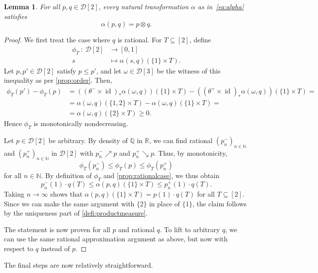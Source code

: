 \documentclass[11pt,a4paper]{scrartcl}
\newcommand{\N}{\mathbb{N}}
\newcommand{\Q}{\mathbb{Q}}
\newcommand{\R}{\mathbb{R}}
\newcommand{\id}{\operatorname{id}}
\newcommand{\finiteset}[1]{[#1]}	%
\newcommand{\two}{\finiteset{2}}		%
\newcommand{\three}{\finiteset{3}}		%
\newcommand{\dist}{\mathcal{D}}
\newtheorem{lem}[theo]{Lemma}
\theoremstyle{definition}
\begin{document}
\begin{lem}\label{lem:bernoulliirrational}
	For all $p, q \in \dist\two$, every natural transformation $\alpha$ as in~\eqref{eq:alpha} satisfies
  \[
	  \alpha(p,q) = p \otimes q.
  \]
\end{lem}
\begin{proof}
	We first treat the case where $q$ is rational.
  For $T \subseteq \two$, define
  \begin{align*}
		\phi_T \: : \: \dist\two & \longrightarrow [0,1] \\
		s & \longmapsto \alpha(s,q)(\{1\} \times T).
  \end{align*}
	Let $p,p' \in \dist \two$ satisfy $p \leq p'$, and let $\omega \in \dist\three$ be the witness of this inequality as per \cref{prop:order}.
	Then,
  \begin{align*}
    \phi_T(p') - \phi_T(p) &= ((\theta^- \times \id)_\ast\alpha(\omega,q))(\{1\} \times T) - ((\theta^+ \times \id)_\ast\alpha(\omega,q))(\{1\} \times T) = \\
                          &= \alpha(\omega,q)(\{1,2\} \times T) - \alpha(\omega,q)(\{1\} \times T) = \\
                          &= \alpha(\omega,q)(\{2\} \times T) \geq 0.
  \end{align*}
  Hence $\phi_T$ is monotonically nondecreasing.

	Let $p \in \dist\two$ be arbitrary. By density of $\Q$ in $\R$, we can find rational $(p_n^-)_{n \in \N}$ and $(p_n^+)_{n \in \N}$ in $\dist\two$ 
	with $p_n^- \nearrow p$ and $p^+_n \searrow p$. Thus, by monotonicity,
    \[
      \phi_T(p^-_n) \leq \phi_T(p) \leq \phi_T(p^+_n)
    \]
  for all $n \in \N$. By definition of $\phi_T$ and \cref{prop:rationalcase}, we thus obtain
  \[
    p^-_n(1) \cdot q(T) \leq \alpha(p,q)(\{1\} \times T) \leq p^+_n(1) \cdot q(T).
  \]
  Taking $n \to \infty$ shows that $\alpha(p,q)(\{1\} \times T) = p(1) \cdot q(T)$ for all $T \subseteq \two$.
	Since we can make the same argument with $\{2\}$ in place of $\{1\}$, the claim follows by the uniqueness part of \cref{defi:productmeasure}.

	The statement is now proven for all $p$ and rational $q$.
	To lift to arbitrary $q$, we can use the same rational approximation argument as above, but now with respect to $q$ instead of $p$.
\end{proof}

The final steps are now relatively straightforward.
\end{document}
